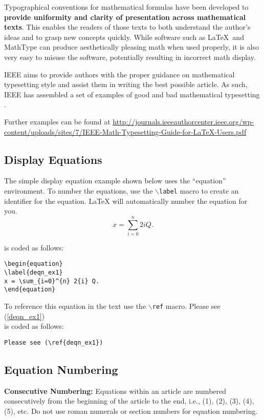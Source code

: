 \documentclass[lettersize,journal]{IEEEtran}
\begin{document}
    Typographical conventions for mathematical formulas have been developed to {\bf provide uniformity and clarity of presentation across mathematical texts}. This enables the readers of those texts to both understand the author's ideas and to grasp new concepts quickly. While software such as \LaTeX \ and MathType\textsuperscript{\textregistered} can produce aesthetically pleasing math when used properly, it is also very easy to misuse the software, potentially resulting in incorrect math display.

    IEEE aims to provide authors with the proper guidance on mathematical typesetting style and assist them in writing the best possible article. As such, IEEE has assembled a set of examples of good and bad mathematical typesetting \cite{ref1,ref2,ref3,ref4,ref5}.

    Further examples can be found at \url{http://journals.ieeeauthorcenter.ieee.org/wp-content/uploads/sites/7/IEEE-Math-Typesetting-Guide-for-LaTeX-Users.pdf}

    \subsection{Display Equations}
    The simple display equation example shown below uses the ``equation'' environment. To number the equations, use the $\backslash${\tt{label}} macro to create an identifier for the equation. LaTeX will automatically number the equation for you.
    \begin{equation}
        \label{deqn_ex1}
        x = \sum_{i=0}^{n} 2{i} Q.
    \end{equation}

    \noindent is coded as follows:
    \begin{verbatim}
\begin{equation}
\label{deqn_ex1}
x = \sum_{i=0}^{n} 2{i} Q.
\end{equation}
    \end{verbatim}

    To reference this equation in the text use the $\backslash${\tt{ref}} macro.
    Please see (\ref{deqn_ex1})\\
    \noindent is coded as follows:
    \begin{verbatim}
Please see (\ref{deqn_ex1})\end{verbatim}

    \subsection{Equation Numbering}
    {\bf{Consecutive Numbering:}} Equations within an article are numbered consecutively from the beginning of the
    article to the end, i.e., (1), (2), (3), (4), (5), etc. Do not use roman numerals or section numbers for equation numbering.
\end{document}
